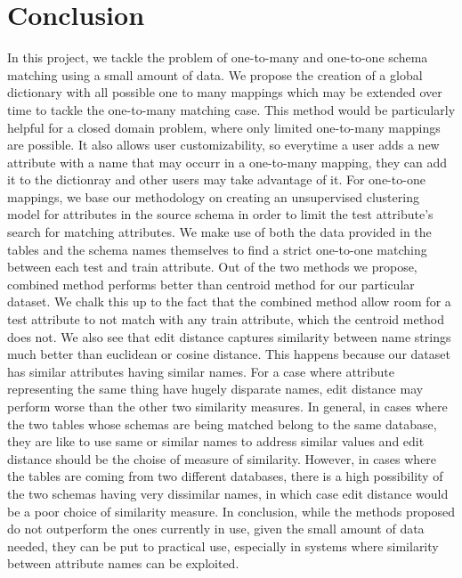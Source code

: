 \documentclass[conference]{IEEEtran}
\begin{document}
\section{Conclusion}
In this project, we tackle the problem of one-to-many and one-to-one schema matching using a small amount of data. We propose the creation of a global dictionary with all possible one to many mappings which may be extended over time to tackle the one-to-many matching case. This method would be particularly helpful for a closed domain problem, where only limited one-to-many mappings are possible. It also allows user customizability, so everytime a user adds a new attribute with a name that may occurr in a one-to-many mapping, they can add it to the dictionray and other users may take advantage of it. For one-to-one mappings, we base our methodology on creating an unsupervised clustering model for attributes in the source schema in order to limit the test attribute's search for matching attributes. We make use of both the data provided in the tables and the schema names themselves to find a strict one-to-one matching between each test and train attribute. Out of the two methods we propose, combined method performs better than centroid method for our particular dataset. We chalk this up to the fact that the combined method allow room for a test attribute to not match with any train attribute, which the centroid method does not. We also see that edit distance captures similarity between name strings much better than euclidean or cosine distance. This happens because our dataset has similar attributes having similar names. For a case where attribute representing the same thing have hugely disparate names, edit distance may perform worse than the other two similarity measures. In general, in cases where the two tables whose schemas are being matched belong to the same database, they are like to use same or similar names to address similar values and edit distance should be the choise of measure of similarity. However, in cases where the tables are coming from two different databases, there is a high possibility of the two schemas having very dissimilar names, in which case edit distance would be a poor choice of similarity measure. In conclusion, while the methods proposed do not outperform the ones currently in use, given the small amount of data needed, they can be put to practical use, especially in systems where similarity between attribute names can be exploited. 
\end{document}

